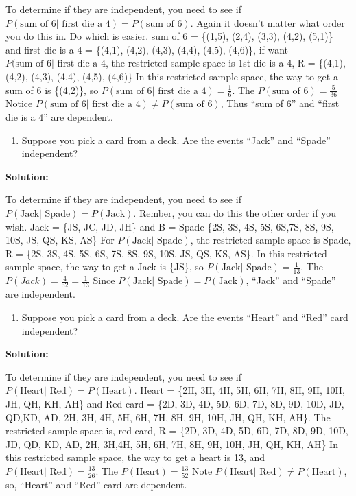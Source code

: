 \documentclass[
]{book}
\providecommand{\tightlist}{%
  \setlength{\itemsep}{0pt}\setlength{\parskip}{0pt}}
\begin{document}
To determine if they are independent, you need to see if \(P(\text{sum of 6| first die a 4})=P(\text{sum of 6})\). Again it doesn't matter what order you do this in. Do which is easier.
sum of 6 = \{(1,5), (2,4), (3,3), (4,2), (5,1)\} and first die is a 4 = \{(4,1), (4,2), (4,3), (4,4), (4,5), (4,6)\}, if want \(P(\text{sum of 6| first die a 4}\), the restricted sample space is 1st die is a 4, R = \{(4,1), (4,2), (4,3), (4,4), (4,5), (4,6)\}
In this restricted sample space, the way to get a sum of 6 is \{(4,2)\},
so \(P(\text{sum of 6| first die a 4})=\frac{1}{6}\).
The \(P(\text{sum of 6})=\frac{5}{36}\)
Notice \(P(\text{sum of 6| first die a 4})\ne P(\text{sum of 6})\), Thus ``sum of 6'' and ``first die is a 4'' are dependent.

\begin{enumerate}
\def\labelenumi{\alph{enumi}.}
\setcounter{enumi}{2}
\tightlist
\item
  Suppose you pick a card from a deck. Are the events ``Jack'' and ``Spade'' independent?
\end{enumerate}

\textbf{Solution:}

To determine if they are independent, you need to see if \(P(\text{Jack| Spade})=P(\text{Jack})\). Rember, you can do this the other order if you wish.
Jack = \{JS, JC, JD, JH\} and B = Spade \{2S, 3S, 4S, 5S, 6S,7S, 8S, 9S, 10S, JS, QS, KS, AS\}
For \(P(\text{Jack| Spade})\), the restricted sample space is Spade, R = \{2S, 3S, 4S, 5S, 6S, 7S, 8S, 9S, 10S, JS, QS, KS, AS\}. In this restricted sample space, the way to get a Jack is \{JS\}, so \(P(\text{Jack| Spade})=\frac{1}{13}\).
The \(P(Jack)=\frac{4}{52}=\frac{1}{13}\)
Since \(P(\text{Jack| Spade})=P(\text{Jack})\), ``Jack'' and ``Spade'' are independent.

\begin{enumerate}
\def\labelenumi{\alph{enumi}.}
\setcounter{enumi}{3}
\tightlist
\item
  Suppose you pick a card from a deck. Are the events ``Heart'' and ``Red'' card independent?
\end{enumerate}

\textbf{Solution:}

To determine if they are independent, you need to see if \(P(\text{Heart| Red})=P(\text{Heart})\).
Heart = \{2H, 3H, 4H, 5H, 6H, 7H, 8H, 9H, 10H, JH, QH, KH, AH\} and
Red card = \{2D, 3D, 4D, 5D, 6D, 7D, 8D, 9D, 10D, JD, QD,KD, AD, 2H, 3H, 4H, 5H, 6H, 7H, 8H, 9H, 10H, JH, QH, KH, AH\}.
The restricted sample space is, red card, R = \{2D, 3D, 4D, 5D, 6D, 7D, 8D, 9D, 10D, JD, QD, KD, AD, 2H, 3H,4H, 5H, 6H, 7H, 8H, 9H, 10H, JH, QH, KH, AH\}
In this restricted sample space, the way to get a heart is 13, and
\(P(\text{Heart| Red})=\frac{13}{26}\).
The \(P(\text{Heart})=\frac{13}{52}\)
Note \(P(\text{Heart| Red})\ne P(\text{Heart})\), so, ``Heart'' and ``Red'' card are dependent.
\end{document}
